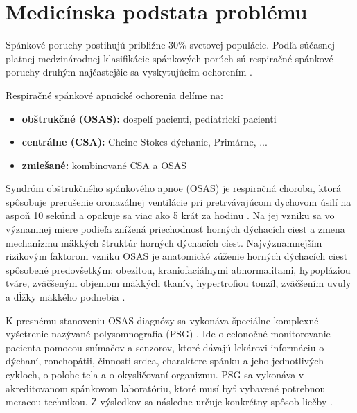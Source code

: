 
\chapter{Medicínska podstata problému} \label{kap:Motivacia}

\pagestyle{fancy}
\fancyhf{}
\fancyfoot[CE,CO]{\thepage}


Spánkové poruchy postihujú približne 30\% svetovej populácie. Podľa súčasnej platnej
medzinárodnej klasifikácie spánkových porúch sú respiračné spánkové poruchy druhým
najčastejšie sa vyskytujúcim ochorením \cite{Sateia_2014}.

Respiračné spánkové apnoické ochorenia delíme na:

\begin{itemize}
	\item \textbf{obštrukčné (OSAS):} dospelí pacienti, pediatrickí pacienti
	\item \textbf{centrálne (CSA):} Cheine-Stokes dýchanie, Primárne, ...
	\item \textbf{zmiešané:} kombinované CSA a OSAS
\end{itemize}

Syndróm obštrukčného spánkového apnoe (OSAS) je respiračná choroba, ktorá spôsobuje
prerušenie oronazálnej ventilácie pri pretrvávajúcom dychovom úsilí na aspoň 10 sekúnd a
opakuje sa viac ako 5 krát za hodinu \cite{Jen_Almeida_Brasher_Doyle-Waters_Salzman_Fleetham_2018}. Na jej vzniku sa vo významnej miere podieľa znížená
priechodnosť horných dýchacích ciest a zmena mechanizmu mäkkých štruktúr horných dýchacích
ciest. Najvýznamnejším rizikovým faktorom vzniku OSAS je anatomické zúženie horných
dýchacích ciest spôsobené predovšetkým: obezitou, kraniofaciálnymi abnormalitami, hypopláziou tváre, zväčšeným objemom mäkkých tkanív, hypertrofiou tonzíl, zväčšením uvuly a dĺžky mäkkého podnebia \cite{Young_Peppard_Gottlieb_2002}.

K presnému stanoveniu OSAS diagnózy sa vykonáva špeciálne komplexné vyšetrenie nazývané
polysomnografia (PSG) \cite{kee2009sleep}. Ide o celonočné monitorovanie pacienta pomocou snímačov a senzorov,
ktoré dávajú lekárovi informáciu o dýchaní, ronchopátii, činnosti srdca, charaktere spánku a jeho jednotlivých cykloch, o polohe tela a o okysličovaní organizmu. PSG sa vykonáva v
akreditovanom spánkovom laboratóriu, ktoré musí byť vybavené potrebnou meracou technikou. Z
výsledkov sa následne určuje konkrétny spôsob liečby \cite{Shrivastava_Jung_Saadat_Sirohi_Crewson_2014}.

